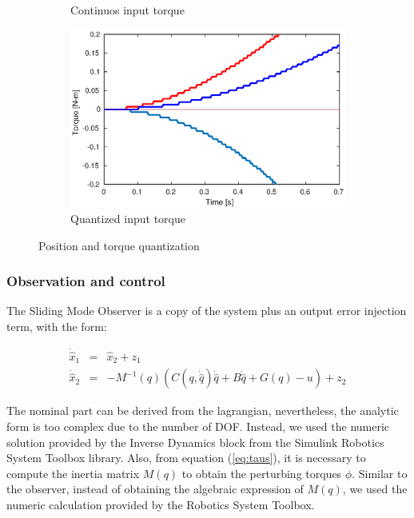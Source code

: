 \documentclass[smallextended]{svjour3}       %
\begin{document}
\begin{figure}[h!]
\begin{subfigure}[b]{0.4\textwidth}
    \caption{Continuos input torque}
    \label{fig:torque_quantized1}
  \end{subfigure}
  \begin{subfigure}[b]{0.4\textwidth}
    \centering
    \includegraphics[width=\textwidth]{Figures/torque_quantized2.eps}
    \caption{Quantized input torque}
    \label{fig:torque_quantized2}
  \end{subfigure}
  \caption{Position and torque quantization}
  \label{fig:quantization}
\end{figure}

\subsubsection*{Observation and control}
The Sliding Mode Observer is a copy of the system plus an output error injection term, with the form:

\begin{eqnarray}
  \dot{\hat{x}}_1 &=& \hat{x}_2 + z_1\label{eq:observer1}\\
  \dot{\hat{x}}_2 &=& -M^{-1}(q)\left(C(q, \dot{\hat{q}})\dot{\hat{q}} + B\dot{\hat{q}} + G(q) - u\right) + z_2\label{eq:observer2}
\end{eqnarray}

  The nominal part can be derived from the lagrangian, nevertheless, the analytic form is too complex due to the number of DOF. Instead, we used the numeric solution provided by the Inverse Dynamics block from the Simulink Robotics System Toolbox library. Also, from equation (\ref{eq:taus}), it is necessary to compute the inertia matrix $M(q)$ to obtain the perturbing torques $\phi$. Similar to the observer, instead of obtaining the algebraic expression of $M(q)$, we used the numeric calculation provided by the Robotics System Toolbox.
  
\end{document}
